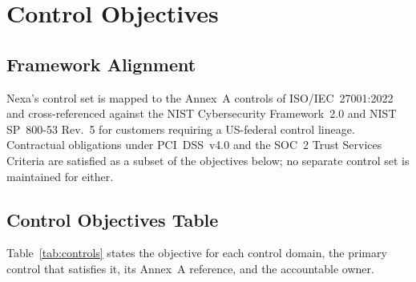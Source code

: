 \section{Control Objectives}

\subsection{Framework Alignment}
Nexa's control set is mapped to the Annex~A controls of ISO/IEC~27001:2022
\cite{iso27001} and cross-referenced against the NIST Cybersecurity Framework~2.0
\cite{nistcsf} and NIST SP~800-53 Rev.~5 \cite{nist80053} for customers requiring a
US-federal control lineage. Contractual obligations under PCI~DSS~v4.0 \cite{pcidss} and
the SOC~2 Trust Services Criteria \cite{soc2} are satisfied as a subset of the objectives
below; no separate control set is maintained for either.

\subsection{Control Objectives Table}
Table~\ref{tab:controls} states the objective for each control domain, the primary
control that satisfies it, its Annex~A reference, and the accountable owner.

